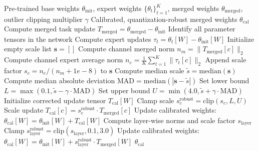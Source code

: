 \documentclass{article}
\theoremstyle{plain}
\theoremstyle{definition}
\theoremstyle{remark}
\begin{document}
\begin{algorithm}[!t]
\caption{Quantization-Robust Parameter Resonance (QR-IPR)}
\label{alg:qripr}
\begin{algorithmic}[1]
 Pre-trained base weights $\theta_{\text{init}}$, expert weights $\{\theta_t\}_{t=1}^K$, merged weights $\theta_{\text{merged}}$, outlier clipping multiplier $\gamma$
 Calibrated, quantization-robust merged weights $\theta_{\text{cal}}$
\STATE Compute merged task update $T_{\text{merged}} = \theta_{\text{merged}} - \theta_{\text{init}}$
\STATE Identify all parameter tensors in the network
        \STATE Compute expert updates $\tau_{t} = \theta_t[W] - \theta_{\text{init}}[W]$
        \STATE Initialize empty scale list $\mathbf{s} = []$
            \STATE Compute channel merged norm $n_{m} = \|T_{\text{merged}}[c]\|_2$
            \STATE Compute channel expert average norm $n_{e} = \frac{1}{K} \sum_{t=1}^K \|\tau_t[c]\|_2$
            \STATE Append scale factor $s_c = n_{e} / (n_{m} + 1e-8)$ to $\mathbf{s}$
        \ENDFOR
        \STATE Compute median scale $\tilde{s} = \text{median}(\mathbf{s})$
        \STATE Compute median absolute deviation $\text{MAD} = \text{median}(|\mathbf{s} - \tilde{s}|)$
        \STATE Set lower bound $L = \max(0.1, \tilde{s} - \gamma \cdot \text{MAD})$
        \STATE Set upper bound $U = \min(4.0, \tilde{s} + \gamma \cdot \text{MAD})$
        \STATE Initialize corrected update tensor $T_{\text{cal}}[W]$
            \STATE Clamp scale $s_c^{\text{robust}} = \text{clip}(s_c, L, U)$
            \STATE Scale update $T_{\text{cal}}[c] = s_c^{\text{robust}} \cdot T_{\text{merged}}[c]$
        \ENDFOR
        \STATE Update calibrated weights: $\theta_{\text{cal}}[W] = \theta_{\text{init}}[W] + T_{\text{cal}}[W]$
    \ELSE
        \STATE Compute layer-wise norms and scale factor $s_{\text{layer}}$
        \STATE Clamp $s_{\text{layer}}^{\text{robust}} = \text{clip}(s_{\text{layer}}, 0.1, 3.0)$
        \STATE Update calibrated weights: $\theta_{\text{cal}}[W] = \theta_{\text{init}}[W] + s_{\text{layer}}^{\text{robust}} \cdot T_{\text{merged}}[W]$
    \ENDIF
\ENDFOR
{} $\theta_{\text{cal}}$
\end{algorithmic}
\end{algorithm}
\end{document}
